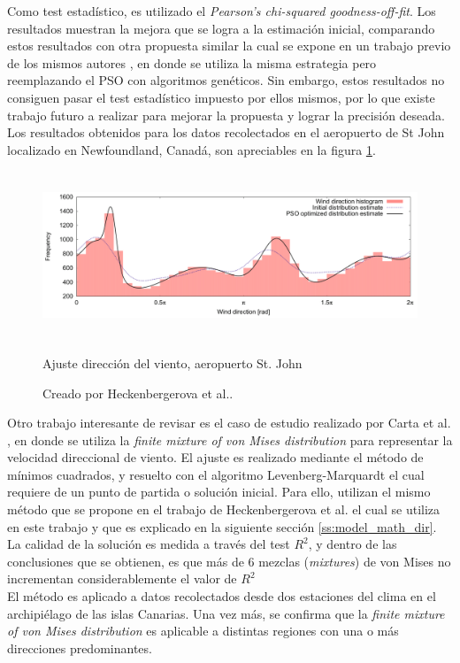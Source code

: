 Como test estadístico, es utilizado el \emph{Pearson's chi-squared goodness-off-fit}. Los resultados muestran la mejora que se logra a la estimación inicial, comparando estos resultados con otra propuesta similar la cual se expone en un trabajo previo de los mismos autores \cite{Heckenbergerova13}, en donde se utiliza la misma estrategia pero reemplazando el PSO con algoritmos genéticos. Sin embargo, estos resultados no consiguen pasar el test estadístico impuesto por ellos mismos, por lo que existe trabajo futuro  a realizar para mejorar la propuesta y lograr la precisión deseada.\\
Los resultados obtenidos para los datos recolectados en el aeropuerto de St John localizado en Newfoundland, Canadá, son apreciables en la figura \ref{fig:dir_pso}.
\begin{figure}[h!]
    \centering    
    \includegraphics[height=50mm]{figures/dir_pso.png} 
    \caption{Ajuste dirección del viento, aeropuerto St. John}
    \vspace{-.25cm} 
    \caption*{Creado por Heckenbergerova et al.\cite{Heckenbergerova15}.}
    \label{fig:dir_pso}
\end{figure}

Otro trabajo interesante de revisar es el caso de estudio realizado por Carta et al. \cite{Carta07}, en donde se utiliza la \emph{finite mixture of von Mises distribution} para representar la velocidad direccional de viento. El ajuste es realizado mediante el método de mínimos cuadrados, y resuelto con el algoritmo Levenberg-Marquardt \cite{Gavin16} el cual requiere de un punto de partida o solución inicial. Para ello, utilizan el mismo método que se propone en el trabajo de Heckenbergerova et al. \cite{Heckenbergerova13} el cual se utiliza en este trabajo y que es explicado en la siguiente sección \ref{ss:model_math_dir}. La calidad de la solución es medida a través del test $R^2$, y dentro de las conclusiones que se obtienen, es que más de 6 mezclas (\emph{mixtures}) de von Mises no incrementan considerablemente el valor de $R^2$\\
El método es aplicado a datos recolectados desde dos estaciones del clima en el archipiélago de las islas Canarias. Una vez más, se confirma que la \emph{finite mixture of von Mises distribution} es aplicable a distintas regiones con una o más direcciones predominantes. 

